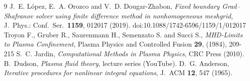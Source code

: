 \documentclass[11pt,a4paper]{article}
\begin{document}
\begin{thebibliography}{9}
 J.~E. L\'opez, E.~A. Orozco and V.~D. Dougar-Zhabon, \emph{Fixed boundary Grad--Shafranov solver using finite difference method in nonhomogeneous meshgrid}, J.\ Phys.: Conf.\ Ser.\ \textbf{1159}, 012017 (2019). doi:10.1088/1742-6596/1159/1/012017
 Troyon F., Gruber R., Saurenmann H., Semenzato S. and Succi S., \emph{MHD-Limits to Plasma Confinement},
Plasma Physics and Controlled Fusion \textbf{29}, (1984), 209-215
 S.~C. Jardin, \emph{Computational Methods in Plasma Physics}, CRC Press (2010).
 B.~Dudson, \emph{Plasma fluid theory}, lecture series (YouTube).
 D.~G. Anderson, \emph{Iterative procedures for nonlinear integral equations}, J.\ ACM \textbf{12}, 547 (1965).
\end{thebibliography}
\end{document}
